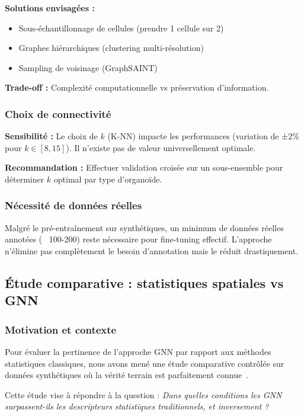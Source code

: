 \textbf{Solutions envisagées :}
\begin{itemize}
    \item Sous-échantillonnage de cellules (prendre 1 cellule sur 2)
    \item Graphes hiérarchiques (clustering multi-résolution)
    \item Sampling de voisinage (GraphSAINT)
\end{itemize}

\textbf{Trade-off :}
Complexité computationnelle vs préservation d'information.

\subsubsection{Choix de connectivité}

\textbf{Sensibilité :}
Le choix de $k$ (K-NN) impacte les performances (variation de ±2\% pour $k \in [8, 15]$). Il n'existe pas de valeur universellement optimale.

\textbf{Recommandation :}
Effectuer validation croisée sur un sous-ensemble pour déterminer $k$ optimal par type d'organoïde.

\subsubsection{Nécessité de données réelles}

Malgré le pré-entraînement sur synthétiques, un minimum de données réelles annotées (~ 100-200) reste nécessaire pour fine-tuning effectif. L'approche n'élimine pas complètement le besoin d'annotation mais le réduit drastiquement.

\subsection{Étude comparative : statistiques spatiales vs GNN}

\subsubsection{Motivation et contexte}

Pour évaluer la pertinence de l'approche GNN par rapport aux méthodes statistiques classiques, nous avons mené une étude comparative contrôlée sur données synthétiques où la vérité terrain est parfaitement connue~\cite{Martin2024GRETSI2}.

Cette étude vise à répondre à la question : \textit{Dans quelles conditions les GNN surpassent-ils les descripteurs statistiques traditionnels, et inversement ?}


